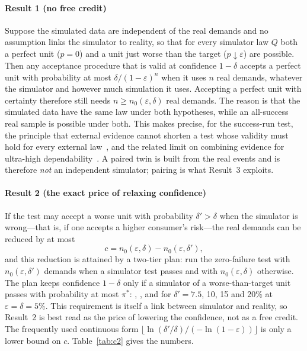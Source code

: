 \paragraph{Result 1 (no free credit)}\label{res:c1} Suppose the simulated data are independent of the real demands and no
assumption links the simulator to reality, so that for every simulator law $Q$ both a perfect unit ($p=0$) and a unit just
worse than the target ($p\downarrow\varepsilon$) are possible. Then any acceptance procedure that is valid at confidence
$1-\delta$ accepts a perfect unit with probability at most $\delta/(1-\varepsilon)^n$ when it uses $n$ real demands,
whatever the simulator and however much simulation it uses. Accepting a perfect unit with certainty therefore still
needs $n\ge n_0(\varepsilon,\delta)$ real demands. The reason is that the simulated data have the same law under both
hypotheses, while an all-success real sample is possible under both. This makes precise, for the success-run test, the principle that external evidence cannot shorten a test whose validity must hold for every external law~\cite{koppschneider2020}, and the related limit on combining evidence for ultra-high dependability~\cite{littlewood1993}. A paired twin is built from the real events and is therefore \emph{not} an
independent simulator; pairing is what Result~3 exploits.

\paragraph{Result 2 (the exact price of relaxing confidence)}\label{res:c2} If the test may accept a worse unit
with probability $\delta'>\delta$ when the simulator is wrong---that is, if one accepts a higher consumer's risk---the
real demands can be reduced by at most
\[c=n_0(\varepsilon,\delta)-n_0(\varepsilon,\delta'),\]
and this reduction is attained by a two-tier plan: run the zero-failure test with $n_0(\varepsilon,\delta')$ demands when
a simulator test passes and with $n_0(\varepsilon,\delta)$ otherwise. The plan keeps confidence $1-\delta$ only if a simulator of a worse-than-target unit passes with probability at most
$\pi^\ast$: \nPiStarA, \nPiStarB, \nPiStarC{} and \nPiStarD{} for $\delta'=7.5$, 10, 15 and 20\% at $\varepsilon=\delta=5\%$.
This requirement is itself a link between simulator and reality, so Result~2 is best read as the price of lowering
the confidence, not as a free credit. The frequently
used continuous form $\lfloor\ln(\delta'/\delta)/(-\ln(1-\varepsilon))\rfloor$ is only a lower bound on $c$.
Table~\ref{tab:c2} gives the numbers.


